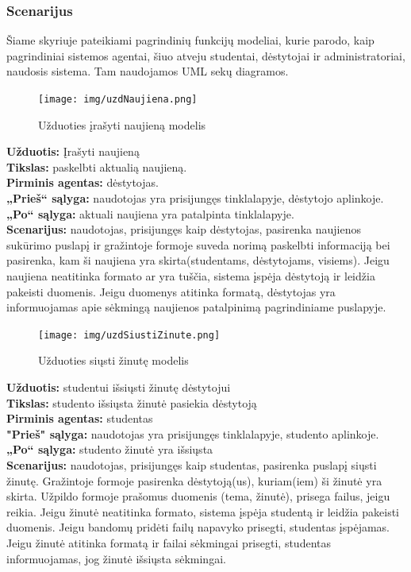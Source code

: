 \documentclass{VUMIFPSkursinis}
\begin{document}
\subsubsection{Scenarijus}
Šiame skyriuje pateikiami pagrindinių funkcijų modeliai, kurie parodo, kaip pagrindiniai sistemos agentai, šiuo atveju studentai, dėstytojai ir administratoriai, naudosis sistema. Tam naudojamos UML sekų diagramos.
\begingroup
\begin{figure}[H]
\centering
\texttt{[image: img/uzdNaujiena.png]}
\caption{Užduoties įrašyti naujieną modelis}
\label{fig:rnaujiena}
\end{figure}
\setlength{\parindent}{0pt}\textbf{Užduotis: } Įrašyti naujieną\\
\textbf{Tikslas: } paskelbti aktualią naujieną.\\
\textbf{Pirminis agentas: } dėstytojas.\\
\textbf{„Prieš“ sąlyga: } naudotojas yra prisijungęs tinklalapyje, dėstytojo aplinkoje.\\
\textbf{„Po“ sąlyga: } aktuali naujiena yra patalpinta tinklalapyje.\\
\textbf{Scenarijus: } naudotojas, prisijungęs kaip dėstytojas, pasirenka naujienos sukūrimo puslapį ir gražintoje formoje suveda norimą paskelbti informaciją bei pasirenka, kam ši naujiena yra skirta(studentams, dėstytojams, visiems). Jeigu naujiena neatitinka formato ar yra tuščia, sistema įspėja dėstytoją ir leidžia pakeisti duomenis. Jeigu duomenys atitinka formatą, dėstytojas yra informuojamas apie sėkmingą naujienos patalpinimą pagrindiniame puslapyje.
\begin{figure}[H]
\centering
\texttt{[image: img/uzdSiustiZinute.png]}
\caption{Užduoties siųsti žinutę modelis}
\label{fig:zinute}
\end{figure}
\textbf{Užduotis: } studentui išsiųsti žinutę dėstytojui\\
\textbf{Tikslas: } studento išsiųsta žinutė pasiekia dėstytoją\\
\textbf{Pirminis agentas: } studentas\\
\textbf{"Prieš" sąlyga: } naudotojas yra prisijungęs tinklalapyje, studento aplinkoje.\\
\textbf{„Po“ sąlyga: } studento žinutė yra išsiųsta\\
\textbf{Scenarijus: } naudotojas, prisijungęs kaip studentas, pasirenka puslapį siųsti žinutę. Gražintoje formoje pasirenka dėstytoją(us), kuriam(iem) ši žinutė yra skirta. Užpildo formoje prašomus duomenis (tema, žinutė), prisega failus, jeigu reikia. Jeigu žinutė neatitinka formato, sistema įspėja studentą ir leidžia pakeisti duomenis. Jeigu bandomų pridėti failų napavyko prisegti, studentas įspėjamas. Jeigu žinutė atitinka formatą ir failai sėkmingai prisegti, studentas informuojamas, jog žinutė išsiųsta sėkmingai.
\end{document}
